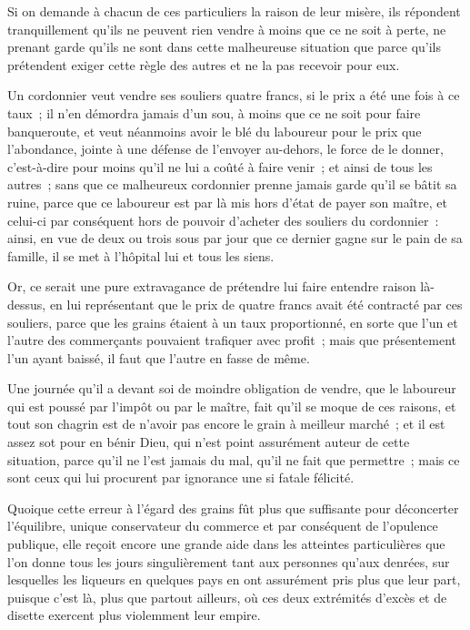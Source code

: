 \documentclass[french,twoside]{book} %
\begin{document}
Si on demande à chacun de ces particuliers la raison de leur misère, ils répondent tranquillement qu’ils ne peuvent rien vendre à moins que ce ne soit à perte, ne prenant garde qu’ils ne sont dans cette malheureuse situation que parce qu’ils prétendent exiger cette règle des autres et ne la pas recevoir pour eux.\par
Un cordonnier veut vendre ses souliers quatre francs, si le prix a été une fois à ce taux ; il n’en démordra jamais d’un sou, à moins que ce ne soit pour faire banqueroute, et veut néanmoins avoir le blé du laboureur pour le prix que l’abondance, jointe à une défense de l’envoyer au-dehors, le force de le donner, c’est-à-dire pour moins qu’il ne lui a coûté à faire venir ; et ainsi de tous les autres ; sans que ce malheureux cordonnier prenne jamais garde qu’il se bâtit sa ruine, parce que ce laboureur est par là mis hors d’état de payer son maître, et celui-ci par conséquent hors de pouvoir d’acheter des souliers du cordonnier : ainsi, en vue de deux ou trois sous par jour que ce dernier gagne sur le pain de sa famille, il se met à l’hôpital lui et tous les siens.\par
Or, ce serait une pure extravagance de prétendre lui faire entendre raison là-dessus, en lui représentant que le prix de quatre francs avait été contracté par ces souliers, parce que les grains étaient à un taux proportionné, en sorte que l’un et l’autre des commerçants pouvaient trafiquer avec profit ; mais que présentement l’un ayant baissé, il faut que l’autre en fasse de même.\par
Une journée qu’il a devant soi de moindre obligation de vendre, que le laboureur qui est poussé par l’impôt ou par le maître, fait qu’il se moque de ces raisons, et tout son chagrin est de n’avoir pas encore le grain à meilleur marché ; et il est assez sot pour en bénir Dieu, qui n’est point assurément auteur de cette situation, parce qu’il ne l’est jamais du mal, qu’il ne fait que permettre ; mais ce sont ceux qui lui procurent par ignorance une si fatale félicité.\par
Quoique cette erreur à l’égard des grains fût plus que suffisante pour déconcerter l’équilibre, unique conservateur du commerce et par conséquent de l’opulence publique, elle reçoit encore une grande aide dans les atteintes particulières que l’on donne tous les jours singulièrement tant aux personnes qu’aux denrées, sur lesquelles les liqueurs en quelques pays en ont assurément pris plus que leur part, puisque c’est là, plus que partout ailleurs, où ces deux extrémités d’excès et de disette exercent plus violemment leur empire.\par
\end{document}

